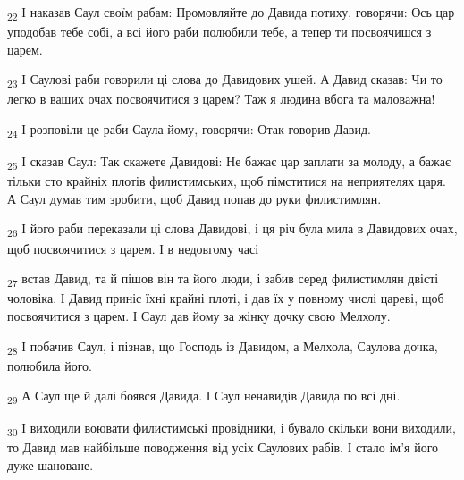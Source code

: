 \begin{tcolorbox}
\textsubscript{22} І наказав Саул своїм рабам: Промовляйте до Давида потиху, говорячи: Ось цар уподобав тебе собі, а всі його раби полюбили тебе, а тепер ти посвоячишся з царем.
\end{tcolorbox}
\begin{tcolorbox}
\textsubscript{23} І Саулові раби говорили ці слова до Давидових ушей. А Давид сказав: Чи то легко в ваших очах посвоячитися з царем? Таж я людина вбога та маловажна!
\end{tcolorbox}
\begin{tcolorbox}
\textsubscript{24} І розповіли це раби Саула йому, говорячи: Отак говорив Давид.
\end{tcolorbox}
\begin{tcolorbox}
\textsubscript{25} І сказав Саул: Так скажете Давидові: Не бажає цар заплати за молоду, а бажає тільки сто крайніх плотів филистимських, щоб пімститися на неприятелях царя. А Саул думав тим зробити, щоб Давид попав до руки филистимлян.
\end{tcolorbox}
\begin{tcolorbox}
\textsubscript{26} І його раби переказали ці слова Давидові, і ця річ була мила в Давидових очах, щоб посвоячитися з царем. І в недовгому часі
\end{tcolorbox}
\begin{tcolorbox}
\textsubscript{27} встав Давид, та й пішов він та його люди, і забив серед филистимлян двісті чоловіка. І Давид приніс їхні крайні плоті, і дав їх у повному числі цареві, щоб посвоячитися з царем. І Саул дав йому за жінку дочку свою Мелхолу.
\end{tcolorbox}
\begin{tcolorbox}
\textsubscript{28} І побачив Саул, і пізнав, що Господь із Давидом, а Мелхола, Саулова дочка, полюбила його.
\end{tcolorbox}
\begin{tcolorbox}
\textsubscript{29} А Саул ще й далі боявся Давида. І Саул ненавидів Давида по всі дні.
\end{tcolorbox}
\begin{tcolorbox}
\textsubscript{30} І виходили воювати филистимські провідники, і бувало скільки вони виходили, то Давид мав найбільше поводження від усіх Саулових рабів. І стало ім'я його дуже шановане.
\end{tcolorbox}
